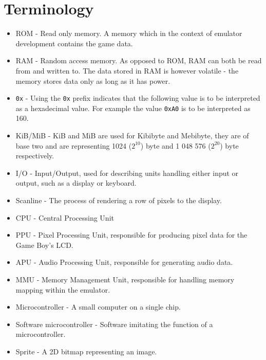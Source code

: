 \chapter*{Terminology}
\thispagestyle{plain}			%

\begin{itemize}
    \item ROM - Read only memory. A memory which in the context of emulator development contains the game data.
    \item RAM - Random access memory. As opposed to ROM, RAM can both be read from and written to. The data stored in RAM is however volatile - the memory stores data only as long as it has power.
    \item \texttt{0x} - Using the \texttt{0x} prefix indicates that the following value is to be interpreted as a hexadecimal value. For example the value \texttt{0xA0} is to be interpreted as 160.
    \item KiB/MiB - KiB and MiB are used for Kibibyte and Mebibyte, they are of base two and are representing  1024 ($2^{10}$) byte and 1 048 576 ($2^{20}$) byte respectively.
    \item I/O - Input/Output, used for describing units handling either input or output, such as a display or keyboard.
    \item Scanline - The process of rendering a row of pixels to the display.
    \item CPU - Central Processing Unit 
    \item PPU - Pixel Processing Unit, responsible for producing pixel data for the Game Boy's LCD.
    \item APU - Audio Processing Unit, responsible for generating audio data.
    \item MMU - Memory Management Unit, responsible for handling memory mapping within the emulator.
    \item Microcontroller - A small computer on a single chip.
    \item Software microcontroller - Software imitating the function of a microcontroller.
    \item Sprite - A 2D bitmap representing an image.
\end{itemize}

\newpage				%
\thispagestyle{plain}